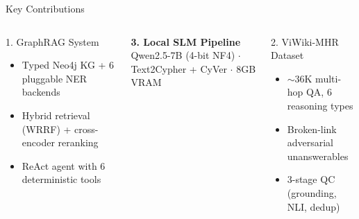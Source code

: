 \documentclass[aspectratio=169]{beamer}
\begin{document}
\begin{frame}{Key Contributions}
\begin{columns}[T]
\begin{exampleblock}{1. GraphRAG System}
\begin{itemize}
  \item Typed Neo4j KG + 6 pluggable NER backends
  \item Hybrid retrieval (WRRF) + cross-encoder reranking
  \item ReAct agent with 6 deterministic tools
\end{itemize}
\end{exampleblock}
\vspace{0.4em}
\textbf{3. Local SLM Pipeline}\\[3pt]
Qwen2.5-7B (4-bit NF4) $\cdot$ Text2Cypher + CyVer $\cdot$ 8GB VRAM

\begin{alertblock}{2. ViWiki-MHR Dataset}
\begin{itemize}
  \item $\sim$36K multi-hop QA, 6 reasoning types
  \item Broken-link adversarial unanswerables
  \item 3-stage QC (grounding, NLI, dedup)
\end{itemize}
\end{alertblock}
\end{columns}
\end{frame}
\end{document}
